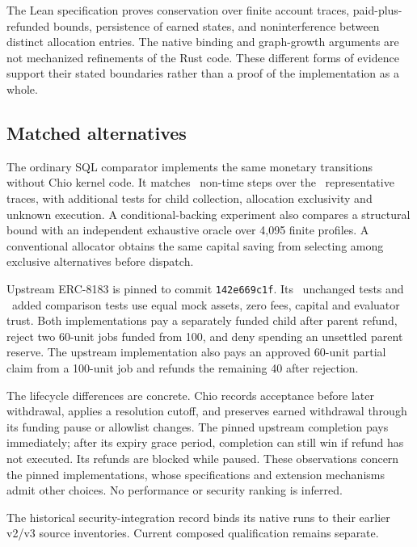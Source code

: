 The Lean specification proves conservation over finite account traces,
paid-plus-refunded bounds, persistence of earned states, and noninterference
between distinct allocation entries. The native binding and graph-growth
arguments are not mechanized refinements of the Rust code. These different
forms of evidence support their stated boundaries rather than a proof of the
implementation as a whole.

\subsection{Matched alternatives}
The ordinary SQL comparator implements the same monetary transitions without
Chio kernel code. It matches \MatchedSteps\ non-time steps over the
\TraceCount\ representative traces, with additional tests for child collection,
allocation exclusivity and unknown execution. A conditional-backing experiment
also compares a structural bound with an independent exhaustive oracle over
4,095 finite profiles. A conventional allocator obtains the same capital
saving from selecting among exclusive alternatives before dispatch.

Upstream ERC-8183 is pinned to commit \texttt{142e669c1f}. Its
\UpstreamTests\ unchanged tests and \PairedTests\ added comparison tests use
equal mock assets, zero fees, capital and evaluator trust. Both implementations
pay a separately funded child after parent refund, reject two 60-unit jobs
funded from 100, and deny spending an unsettled parent reserve.
The upstream implementation also pays an approved 60-unit partial claim from a
100-unit job and refunds the remaining 40 after rejection.

The lifecycle differences are concrete. Chio records acceptance before later
withdrawal, applies a resolution cutoff, and preserves earned withdrawal through
its funding pause or allowlist changes. The pinned upstream completion pays
immediately; after its expiry grace period, completion can still win if refund
has not executed. Its refunds are blocked while paused. These observations
concern the pinned implementations, whose specifications and extension
mechanisms admit other choices. No performance or security ranking is inferred.

The historical security-integration record binds its native runs to their
earlier v2/v3 source inventories. Current composed qualification remains separate.
